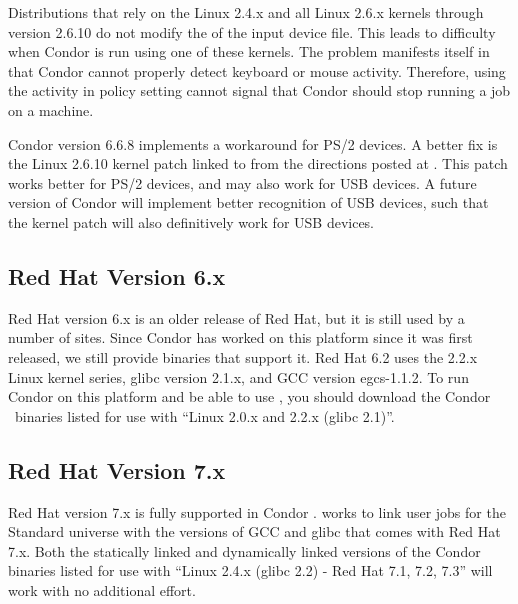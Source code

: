 Distributions that rely on the Linux 2.4.x and all Linux 2.6.x kernels
through version 2.6.10
do not modify the  of the input device file.
This leads to difficulty when Condor is run using one of these
kernels. 
The problem manifests itself in that Condor cannot properly
detect keyboard or mouse activity.
Therefore, using the activity in policy setting cannot
signal that Condor should stop running a job on a machine.

Condor version 6.6.8 implements a workaround for PS/2 devices.
A better fix is the Linux 2.6.10 kernel
patch linked to from the directions posted at
.
This patch works better for PS/2 devices, and
may also work for USB devices.
A future version of Condor will implement better recognition
of USB devices,
such that the kernel patch will also definitively work for USB devices.

\subsection{\label{sec:platform-linux-rh6}Red Hat Version 6.x}

Red Hat version 6.x is an older release of Red Hat, but it is still used
by a number of sites.
Since Condor has worked on this platform since it was first released,
we still provide binaries that support it.
Red Hat 6.2 uses the 2.2.x Linux kernel series, glibc version 2.1.x,
and GCC version egcs-1.1.2.
To run Condor on this platform and be able to use ,
you should download the Condor \VersionNotice\  binaries listed for use
with ``Linux 2.0.x and 2.2.x (glibc 2.1)''.


\subsection{\label{sec:platform-linux-rh7}Red Hat Version 7.x}

Red Hat version 7.x is fully supported in Condor \VersionNotice.
 works to link user jobs for the Standard universe
with the versions of GCC and glibc that comes with Red Hat 7.x.
Both the statically linked and dynamically linked versions of the
Condor binaries listed for use with ``Linux 2.4.x (glibc 2.2) - Red Hat
7.1, 7.2, 7.3'' will work with no additional effort.


